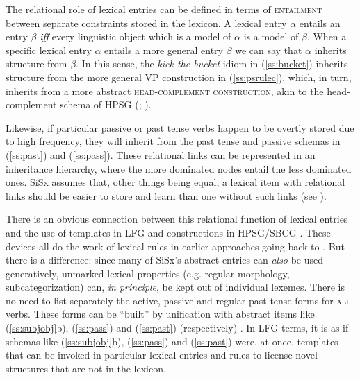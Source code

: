 \documentclass[output=paper,hidelinks]{langscibook}
\begin{document}
The relational role of lexical entries can be defined in terms of \textsc{entailment} between separate constraints stored in the lexicon. A lexical entry $\alpha$ entails an entry $\beta$ \textit{iff} every linguistic object which is a model of $\alpha$ is a model of $\beta$. When a specific lexical entry $\alpha$ entails a more general entry $\beta$ we can say that $\alpha$ inherits structure from $\beta$. In this sense, the \textit{kick the bucket} idiom in (\ref{ss:bucket}) inherits structure from the more general VP construction in (\ref{ss:psrulec}), which, in turn, inherits from a more abstract \textsc{head-complement construction}, akin to the head-complement schema of HPSG (\citealt[33--34]{pollard1994head-driven}; \citetv[\pageref{page:1867}--\pageref{page:1868}, \pageref{fig:hpsg:types}]{chapters/HPSG}).

Likewise, if  particular passive or past tense verbs happen to be overtly stored due to high frequency, they will inherit from the past tense and passive schemas in (\ref{ss:past}) and (\ref{ss:pass}). These relational links can be represented in an inheritance hierarchy, where the more dominated nodes entail the less dominated ones. SiSx assumes that, other things being equal, a lexical item with relational links should be easier to store and learn than one without such links (see \citealt{jackendoff1975morphological}).

There is an obvious connection between this relational function of lexical entries  and the use of templates  in LFG and constructions in HPSG/SBCG \citep{sag2003syntactic, dalrymple2004linguistic, asudeh2013constructions}. These devices all do the work of lexical rules in earlier approaches going back to \citet{chomsky1970remarks}. But there is a difference:  since many of SiSx's abstract entries can \textit{also} be used generatively, unmarked lexical properties (e.g. regular morphology, subcategorization) can, \textit{in principle}, be kept out of individual lexemes. There is no need to list separately the active, passive and regular past tense forms for \textsc{all} verbs. These forms can be ``built'' by unification with abstract items like (\ref{ss:subjobj}b), (\ref{ss:pass}) and (\ref{ss:past}) (respectively) \citep[188]{culicover2005simpler}. In LFG terms, it is as if schemas like (\ref{ss:subjobj}b), (\ref{ss:pass}) and (\ref{ss:past}) were, at once, templates that can be invoked in particular lexical entries and rules to license novel structures that are not in the lexicon.
\end{document}
